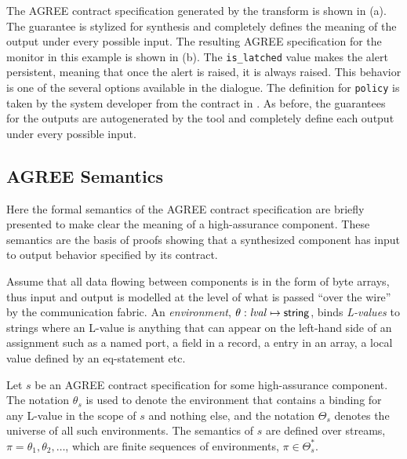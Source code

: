 The AGREE contract specification generated by the transform is shown in (a). The guarantee is stylized for synthesis and completely defines the meaning of the output under every possible input.
The resulting AGREE specification for the monitor in this example is shown in (b). The \texttt{is\_latched} value makes the alert persistent, meaning that once the alert is raised, it is always raised.  This behavior is one of the several options available in the dialogue. The definition for \texttt{policy} is taken by the system developer from the contract in . As before, the guarantees for the outputs are autogenerated by the tool and completely define each output under every possible input.

\subsection{AGREE Semantics}
\label{agree-semantics}

Here the formal semantics of the AGREE contract specification are
briefly presented to make clear the meaning of a high-assurance
component.  These semantics are the basis of proofs showing that a
synthesized component has input to output behavior specified by its
contract.

Assume that all data flowing between components is in the form of byte
arrays, thus input and output is modelled at the level of what is
passed ``over the wire'' by the communication fabric. An \emph{environment},
$\theta: \mathit{lval} \mapsto \mathsf{string}$, binds \emph{L-values} to
strings where an L-value is anything that can appear on the left-hand
side of an assignment such as a named port, a field in a record, a
entry in an array, a local value defined by an eq-statement etc.

Let $s$ be an AGREE contract specification for some high-assurance
component. The notation $\theta_s$ is used to denote the environment that
contains a binding for any L-value in the scope of $s$ and nothing else, and
the notation $\Theta_s$ denotes the universe of all such environments. The
semantics of $s$ are defined over streams, $\pi = \theta_1, \theta_2, \ldots$, which
are finite sequences of environments, $\pi \in \Theta_s^*$.


